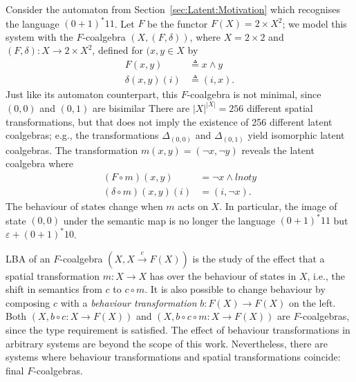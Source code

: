 \begin{example}
\label{ex:Latent:TheExample}
Consider the automaton from Section~\ref{sec:Latent:Motivation} which recognises the language $(0+1)^*11$. Let $F$ be the functor $F(X)=2\times X^2$; we model this system with the $F$-coalgebra $(X,(F,\delta))$, where $X=2\times2$ and $(F,\delta)\colon X\rightarrow 2\times X^2$, defined for $(x,y\in X$ by
\begin{align}
    F(x,y)&\triangleq x \land y\\
    \delta(x,y)(i)&\triangleq (i,x).
\end{align}
Just like its automaton counterpart, this $F$-coalgebra is not minimal, since $(0,0)$ and $(0,1)$ are bisimilar
There are $|X|^{|X|}=256$ different spatial transformations, but that does not imply the existence of 256 different latent coalgebras; e.g., the transformations $\Delta_{(0,0)}$ and $\Delta_{(0,1)}$ yield isomorphic latent coalgebras. 
The transformation $m(x,y)=(\lnot x,\lnot y)$ reveals the latent coalgebra where 
\begin{align}
    (F\circ m)(x,y)&= \lnot x \land lnot y\\
    (\delta\circ m)(x,y)(i)&= (i,\lnot x).
\end{align}
The behaviour of states change when $m$ acts on $X$. In particular, the image of state $(0,0)$ under the semantic map is no longer the language $(0+1)^*11$ but $\varepsilon +(0+1)^*10$.
\end{example}

LBA of an $F$-coalgebra $(X,X\xrightarrow{c} F(X))$ is the study of the effect that a spatial transformation $m\colon X\rightarrow X$ has over the behaviour of states in $X$, i.e., the shift in semantics from $c$ to $c\circ m$. It is also possible to change behaviour by composing $c$ with a \emph{behaviour transformation} $b\colon F(X)\rightarrow F(X)$ on the left. Both $(X,b\circ c\colon X\rightarrow F(X))$ and $(X,b\circ c\circ m\colon X\rightarrow F(X))$ are $F$-coalgebras, since the type requirement is satisfied. The effect of behaviour transformations in arbitrary systems are beyond the scope of this work. Nevertheless, there are systems where behaviour transformations and spatial transformations coincide: final $F$-coalgebras.

